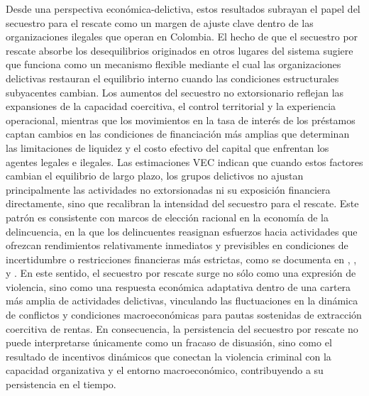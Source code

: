 \documentclass[12pt]{article}
\providecommand{\textcite}{\citet}
\theoremstyle{definition}
\theoremstyle{remark}
\newcommand{\1}{\mathbf{1}}
\begin{document}
Desde una perspectiva económica-delictiva, estos resultados subrayan el papel del secuestro para el rescate como un margen de ajuste clave dentro de las organizaciones ilegales que operan en Colombia. El hecho de que el secuestro por rescate absorbe los desequilibrios originados en otros lugares del sistema sugiere que funciona como un mecanismo flexible mediante el cual las organizaciones delictivas restauran el equilibrio interno cuando las condiciones estructurales subyacentes cambian. Los aumentos del secuestro no extorsionario reflejan las expansiones de la capacidad coercitiva, el control territorial y la experiencia operacional, mientras que los movimientos en la tasa de interés de los préstamos captan cambios en las condiciones de financiación más amplias que determinan las limitaciones de liquidez y el costo efectivo del capital que enfrentan los agentes legales e ilegales. Las estimaciones VEC indican que cuando estos factores cambian el equilibrio de largo plazo, los grupos delictivos no ajustan principalmente las actividades no extorsionadas ni su exposición financiera directamente, sino que recalibran la intensidad del secuestro para el rescate. Este patrón es consistente con marcos de elección racional en la economía de la delincuencia, en la que los delincuentes reasignan esfuerzos hacia actividades que ofrezcan rendimientos relativamente inmediatos y previsibles en condiciones de incertidumbre o restricciones financieras más estrictas, como se documenta en \textcite{Becker1968}, \textcite{Ehrlich1973}, y \textcite{LevittMiles2006}. En este sentido, el secuestro por rescate surge no sólo como una expresión de violencia, sino como una respuesta económica adaptativa dentro de una cartera más amplia de actividades delictivas, vinculando las fluctuaciones en la dinámica de conflictos y condiciones macroeconómicas para pautas sostenidas de extracción coercitiva de rentas. En consecuencia, la persistencia del secuestro por rescate no puede interpretarse únicamente como un fracaso de disuasión, sino como el resultado de incentivos dinámicos que conectan la violencia criminal con la capacidad organizativa y el entorno macroeconómico, contribuyendo a su persistencia en el tiempo.
\end{document}
